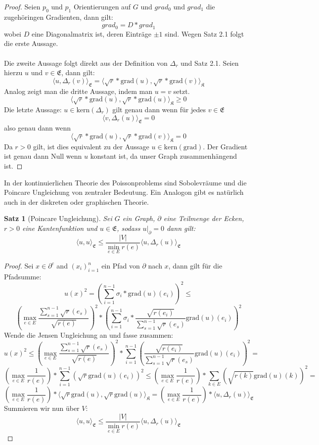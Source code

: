 \documentclass[11pt,a4paper,leqno]{report}
\newtheorem{proposition}{Satz}[chapter]
\numberwithin{equation}{chapter}
\begin{document}
\begin{proof}
	Seien $p_0$ und $p_1$ Orientierungen auf $G$ und $grad_0$ und $grad_1$ die zugeh\"oringen Gradienten, dann gilt:
	$$grad_0 = D * grad_1$$
	wobei $D$ eine Diagonalmatrix ist, deren Eintr\"age $\pm 1 $ sind. Wegen Satz 2.1 folgt die erste Aussage.\\
	\\
	Die zweite Aussage folgt direkt aus der Definition von $\Delta_r$ und Satz 2.1. Seien hierzu $u$ und $v\in\mathfrak{E}$, dann gilt:
	$$\langle u, \Delta_r(v)\rangle_\mathfrak{E} = \langle \sqrt{r}*\text{grad}(u), \sqrt{r}*\text{grad}(v)\rangle_\mathfrak{K}$$
	Analog zeigt man die dritte Aussage, indem man $u=v$ setzt.
	$$\langle \sqrt{r}*\text{grad}(u), \sqrt{r}*\text{grad}(u)\rangle_\mathfrak{K}\geq 0$$
	Die letzte Aussage: $u\in\text{kern}(\Delta_r)$ gilt genau dann wenn f\"ur jedes $v\in\mathfrak{E}$
	$$\langle v, \Delta_r(u)\rangle_\mathfrak{E}=0$$
	also genau dann wenn
	$$\langle \sqrt{r}*\text{grad}(u), \sqrt{r}*\text{grad}(v)\rangle_\mathfrak{K}=0$$
	Da $r>0$ gilt, ist dies equivalent zu der Aussage $u\in\text{kern}(\text{grad})$. Der Gradient ist genau dann Null wenn $u$ konstant ist, da unser Graph zusammenh\"angend ist.
\end{proof}
\noindent
In der kontinuierlichen Theorie des Poissonproblems sind Sobolevr\"aume und die Poincare Ungleichung von zentraler Bedeutung. Ein Analogon gibt es nat\"urlich auch in der diskreten oder graphischen Theorie.
\begin{proposition}[Poincare Ungleichung]
	Sei $G$ ein Graph, $\partial$ eine Teilmenge der Ecken, $r>0$ eine Kantenfunktion und $u\in\mathfrak{E}$, sodass $u|_\partial=0$ dann gilt:
	$$\langle u, u\rangle_{\mathfrak{E}}\leq \frac{|V|}{\min_{e\in E}r(e)} \langle u, \Delta_r(u)\rangle_{\mathfrak{E}}$$
\end{proposition}
\begin{proof}
	Sei $x\in\partial^c$ and $(x_i)_{i=1}^n$ ein Pfad von $\partial$ nach $x$, dann gilt f\"ur die Pfadsumme:
	$$u(x)^2 = (\sum_{i=1}^{n-1} \sigma_i *\text{grad}(u)(e_i))^2 \leq $$
	$$(\max_{e\in E}\frac{\sum_{s=1}^{n-1}\sqrt{r}(e_s)}{\sqrt{r(e)}})^2*(\sum_{i=1}^{n-1} \sigma_i *\frac{\sqrt{r(e_i)}}{\sum_{s=1}^{n-1}\sqrt{r}(e_s)}\text{grad}(u)(e_i))^2$$
	Wende die Jensen Ungleichung an und fasse zusammen:
	$$u(x)^2\leq (\max_{e\in E}\frac{\sum_{s=1}^{n-1}\sqrt{r}(e_s)}{\sqrt{r(e)}})^2*\sum_{i=1}^{n-1}(\frac{\sqrt{r(e_i)}}{\sum_{s=1}^{n-1}\sqrt{r}(e_s)}\text{grad}(u)(e_i))^2=$$
	$$(\max_{e\in E}\frac{1}{r(e)})*\sum_{i=1}^{n-1} (\sqrt{r}\text{grad}(u)(e_i))^2\leq(\max_{e\in E}\frac{1}{r(e)})*\sum_{k\in E} (\sqrt{r(k)}\text{grad}(u)(k))^2=$$
	$$(\max_{e\in E}\frac{1}{r(e)})*\langle \sqrt{r}\text{grad}(u), \sqrt{r}\text{grad}(u)\rangle_{\mathfrak{K}}=(\max_{e\in E}\frac{1}{r(e)})*\langle u, \Delta_r(u)\rangle_{\mathfrak{E}}$$
	Summieren wir nun \"uber $V$:
	$$\langle u, u\rangle_{\mathfrak{E}}\leq \frac{|V|}{\min_{e\in E}r(e)} \langle u, \Delta_r(u)\rangle_{\mathfrak{E}}$$
\end{proof}
\end{document}
